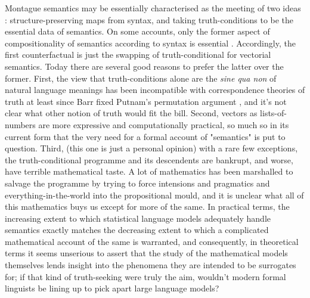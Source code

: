 
Montague semantics may be essentially characterised as the meeting of two ideas \citep{parteeChapterMontagueGrammar1997}: structure-preserving maps from syntax, and taking truth-conditions to be the essential data of semantics. On some accounts, only the former aspect of compositionality of semantics according to syntax is essential \citep{szaboCompositionalitySupervenience2000}. Accordingly, the first counterfactual is just the swapping of truth-conditional for vectorial semantics. Today there are several good reasons to prefer the latter over the former. First, the view that truth-conditions alone are the \emph{sine qua non} of natural language meanings has been incompatible with correspondence theories of truth at least since Barr fixed Putnam's permutation argument \citep{putnamProblemReference1981,barrNOTETHEOREMPUTNAMa}, and it's not clear what other notion of truth would fit the bill. Second, vectors as lists-of-numbers are more expressive and computationally practical, so much so in its current form that the very need for a formal account of "semantics" is put to question. Third, (this one is just a personal opinion) with a rare few exceptions, the truth-conditional programme and its descendents are bankrupt, and worse, have terrible mathematical taste. A lot of mathematics has been marshalled to salvage the programme by trying to force intensions and pragmatics and everything-in-the-world into the propositional mould, and it is unclear what all of this mathematics buys us except for more of the same. In practical terms, the increasing extent to which statistical language models adequately handle semantics exactly matches the decreasing extent to which a complicated mathematical account of the same is warranted, and consequently, in theoretical terms it seems unserious to assert that the study of the mathematical models themselves lends insight into the phenomena they are intended to be surrogates for; if that kind of truth-seeking were truly the aim, wouldn't modern formal linguists be lining up to pick apart large language models?\\

